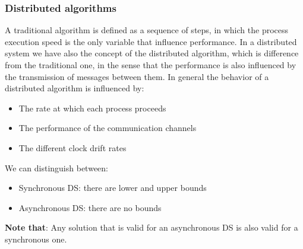     \subsubsection{Distributed algorithms}
    A traditional algorithm is defined as a sequence of steps, in which the process
    execution speed is the only variable that influence performance. In a distributed
    system we have also the concept of the distributed algorithm, which is difference 
    from the traditional one, in the sense that the performance is also influenced by 
    the transmission of messages between them. In general the behavior of a distributed
    algorithm is influenced by:
    \begin{itemize}
        \item The rate at which each process proceeds
        \item The performance of the communication channels
        \item The different clock drift rates
    \end{itemize}
    We can distinguish between:
    \begin{itemize}
        \item Synchronous DS: there are lower and upper bounds
        \item Asynchronous DS: there are no bounds
    \end{itemize}
    \textbf{Note that}: Any solution that is valid for an asynchronous DS is also valid for a synchronous one.